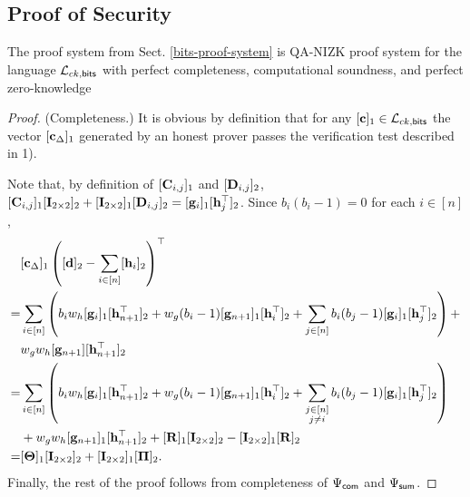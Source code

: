 %


\subsection{Proof of Security}

\begin{theorem}
The proof system from Sect. \ref{bits-proof-system} is QA-NIZK proof system for the language $\mathcal{L}_{ck,\mathsf{bits}}$ with perfect completeness, computational soundness, and perfect zero-knowledge
\end{theorem}

\begin{proof}
(Completeness.) It is obvious by definition that for any $[\mathbf{c}]_1\in \mathcal{L}_{ck,\mathsf{bits}}$
the vector $[\mathbf{c}_\Delta]_1$
generated by an honest prover passes the verification test described in 1).

Note that,
by definition of $[\mathbf{{C}}_{i,j}]_1$ and $[\mathbf{{D}}_{i,j}]_2$, 
$[\mathbf{{C}}_{i,j}]_1[\mathbf{{I}}_{2\times2}]_2 + [\mathbf{{I}}_{2\times2}]_1 [\mathbf{{D}}_{i,j}]_2
= [\mathbf{g}_{i}]_1[\mathbf{h}_j^\top]_2$.  Since $b_i(b_i-1) = 0$ for each $i\in[n]$,
\begin{align*}
&[\mathbf{c}_{\Delta}]_1 \left( [\mathbf{d}]_2 - \sum_{i\in[n]} [\mathbf{h}_{i}]_2 \right)^\top \\
  =& 
    \sum_{i \in [n]}\left(
        b_i w_h[\mathbf{g}_{i}]_1[\mathbf{h}_{n+1}^{\top}]_2 +w_g(b_i-1) [\mathbf{g}_{n+1}]_1[\mathbf{h}_i^{\top}]_2 +
        \sum_{j \in [n]} b_i (b_j-1) [\mathbf{g}_{i}]_1[\mathbf{h}_{j}^{\top}]_2
    \right) +\\
&
    w_gw_h [\mathbf{g}_{n+1}][\mathbf{h}_{n+1}^{\top}]_2
\\  = & 
    \sum_{i \in [n]}\left(
        b_i w_h[\mathbf{g}_{i}]_1[\mathbf{h}_{n+1}^\top]_2 +
        w_g(b_i-1) [\mathbf{g}_{n+1}]_1[\mathbf{h}_{i}^\top]_2 +
        \sum_{\substack{j \in [n]\\ j\neq i}} b_i (b_j-1) [\mathbf{g}_{i}]_1[\mathbf{h}_{j}^\top]_2
    \right)
\\  &
    + w_gw_h [\mathbf{g}_{n+1}]_1[\mathbf{h}_{n+1}^\top]_2 +
    [\mathbf{{R}}]_1[\mathbf{{I}}_{2\times2}]_2 - [\mathbf{{I}}_{2\times2}]_1[\mathbf{{R}}]_2
\\  = &
    [\mathbf{{\Theta}}]_1[\mathbf{{I}}_{2\times2}]_2 +
    [\mathbf{{I}}_{2\times2}]_1[\mathbf{{\Pi}}]_2.
\end{align*}
Finally, the rest of the proof follows from completeness of ${\Psi_{\mathsf{com}}}$ and ${\Psi_{\mathsf{sum}}}$. 


\end{proof}

